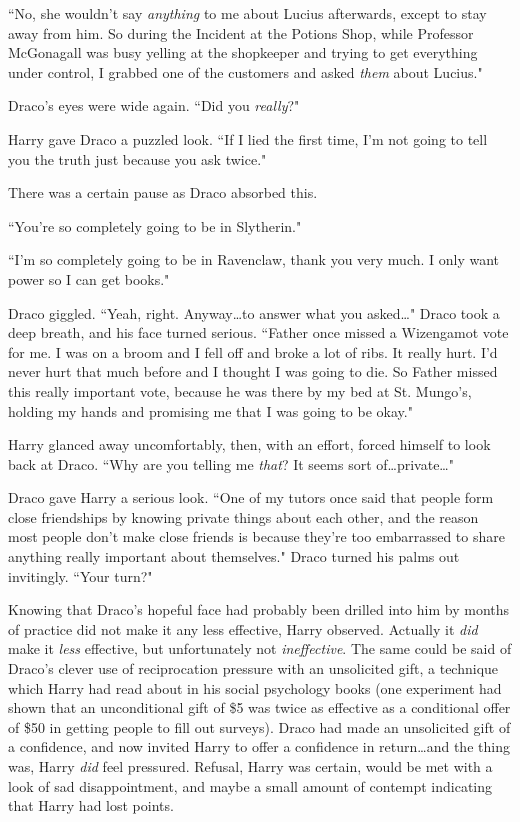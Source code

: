 ``No, she wouldn't say \emph{anything} to me about Lucius afterwards, except to stay away from him. So during the Incident at the Potions Shop, while Professor McGonagall was busy yelling at the shopkeeper and trying to get everything under control, I grabbed one of the customers and asked \emph{them} about Lucius."

Draco's eyes were wide again. ``Did you \emph{really}?"

Harry gave Draco a puzzled look. ``If I lied the first time, I'm not going to tell you the truth just because you ask twice."

There was a certain pause as Draco absorbed this.

``You're so completely going to be in Slytherin."

``I'm so completely going to be in Ravenclaw, thank you very much. I only want power so I can get books."

Draco giggled. ``Yeah, right. Anyway…to answer what you asked…" Draco took a deep breath, and his face turned serious. ``Father once missed a Wizengamot vote for me. I was on a broom and I fell off and broke a lot of ribs. It really hurt. I'd never hurt that much before and I thought I was going to die. So Father missed this really important vote, because he was there by my bed at St. Mungo's, holding my hands and promising me that I was going to be okay."

Harry glanced away uncomfortably, then, with an effort, forced himself to look back at Draco. ``Why are you telling me \emph{that}? It seems sort of…private…"

Draco gave Harry a serious look. ``One of my tutors once said that people form close friendships by knowing private things about each other, and the reason most people don't make close friends is because they're too embarrassed to share anything really important about themselves." Draco turned his palms out invitingly. ``Your turn?"

Knowing that Draco's hopeful face had probably been drilled into him by months of practice did not make it any less effective, Harry observed. Actually it \emph{did} make it \emph{less} effective, but unfortunately not \emph{ineffective}. The same could be said of Draco's clever use of reciprocation pressure with an unsolicited gift, a technique which Harry had read about in his social psychology books (one experiment had shown that an unconditional gift of \$5 was twice as effective as a conditional offer of \$50 in getting people to fill out surveys). Draco had made an unsolicited gift of a confidence, and now invited Harry to offer a confidence in return…and the thing was, Harry \emph{did} feel pressured. Refusal, Harry was certain, would be met with a look of sad disappointment, and maybe a small amount of contempt indicating that Harry had lost points.

